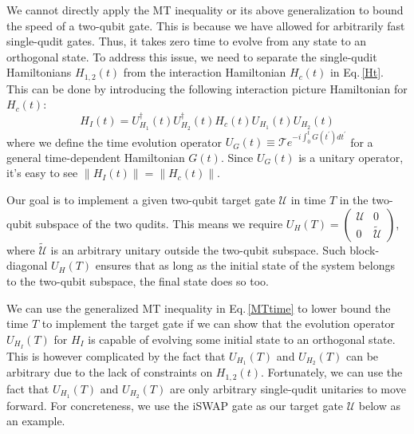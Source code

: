 \documentclass[twocolumn,english,pra,superscriptaddress]{revtex4-1}
\begin{document}
We cannot directly apply the MT inequality or its above generalization to bound the speed of a two-qubit gate. This is because we have allowed for arbitrarily fast single-qudit gates. Thus, it takes zero time to evolve from any state to an orthogonal state. To address this issue, we need to separate the single-qudit Hamiltonians $H_{1,2}(t)$ from the interaction Hamiltonian $H_c(t)$ in Eq.\,\eqref{Ht}. This can be done by introducing the following interaction picture Hamiltonian for $H_c(t)$:
\begin{equation} \label{HcI}
        H_I(t) = U^{\dagger}_{H_1}(t) U^{\dagger}_{H_2}(t) H_c(t) U_{H_1}(t) U_{H_2}(t)
\end{equation}
where we define the time evolution operator $U_G(t) \equiv \mathcal{T} e^ {-i \int_0^t  G(t^{\prime}) dt^{\prime}}$ for a general time-dependent Hamiltonian $G(t)$. Since $U_G(t)$ is a unitary operator, it's easy to see $\lVert H_I(t) \rVert = \lVert H_c(t)\rVert$.

Our goal is to implement a given two-qubit target gate $\mathcal{U}$ in time $T$ in the two-qubit subspace of the two qudits. This means we require $U_H(T) = \begin{pmatrix}\mathcal{U} & 0\\ 0 & \tilde{\mathcal{U}} \end{pmatrix}$, where $\tilde{\mathcal{U}}$ is an arbitrary unitary outside the two-qubit subspace. Such block-diagonal $U_H(T)$ ensures that as long as the initial state of the system belongs to the two-qubit subspace, the final state does so too.

We can use the generalized MT inequality in Eq.\,\eqref{MTtime} to lower bound the time $T$ to implement the target gate if we can show that the evolution operator $U_{H_I}(T)$ for $H_I$ is capable of evolving some initial state to an orthogonal state. This is however complicated by the fact that $U_{H_1}(T)$ and $U_{H_2}(T)$ can be arbitrary due to the lack of constraints on $H_{1,2}(t)$.  Fortunately, we can use the fact that $U_{H_1}(T)$ and $U_{H_2}(T)$ are only arbitrary single-qudit unitaries to move forward. For concreteness, we use the iSWAP gate as our target gate $\mathcal{U}$ below as an example.
\end{document}
